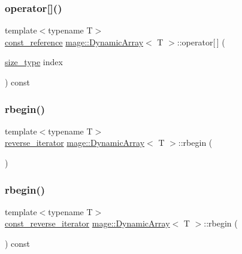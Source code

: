\subsubsection{\texorpdfstring{operator[]()}{operator[]()}\hspace{0.1cm}{\footnotesize\ttfamily [2/2]}}
{\footnotesize\ttfamily template$<$typename T$>$ \\
\mbox{\hyperlink{classmage_1_1_dynamic_array_ad2c044077223c0463e317649d4513dbc}{const\+\_\+reference}} \mbox{\hyperlink{classmage_1_1_dynamic_array}{mage\+::\+Dynamic\+Array}}$<$ T $>$\+::operator\mbox{[}$\,$\mbox{]} (\begin{DoxyParamCaption}\item[{\mbox{\hyperlink{classmage_1_1_dynamic_array_abae3236bcd8d1de414cbdf05219966b9}{size\+\_\+type}}}]{index }\end{DoxyParamCaption}) const\hspace{0.3cm}{\ttfamily [noexcept]}}

\mbox{\label{classmage_1_1_dynamic_array_ab08c41e1d517fdf97a680d956e28ea2a}} 
\subsubsection{\texorpdfstring{rbegin()}{rbegin()}\hspace{0.1cm}{\footnotesize\ttfamily [1/2]}}
{\footnotesize\ttfamily template$<$typename T$>$ \\
\mbox{\hyperlink{classmage_1_1_dynamic_array_a92d505734e8500e429d6b6e690b83dab}{reverse\+\_\+iterator}} \mbox{\hyperlink{classmage_1_1_dynamic_array}{mage\+::\+Dynamic\+Array}}$<$ T $>$\+::rbegin (\begin{DoxyParamCaption}{ }\end{DoxyParamCaption})\hspace{0.3cm}{\ttfamily [noexcept]}}

\mbox{\label{classmage_1_1_dynamic_array_a13f1ae391363a64c50bd3ffbe3100d78}} 
\subsubsection{\texorpdfstring{rbegin()}{rbegin()}\hspace{0.1cm}{\footnotesize\ttfamily [2/2]}}
{\footnotesize\ttfamily template$<$typename T$>$ \\
\mbox{\hyperlink{classmage_1_1_dynamic_array_afbcc530c2cd68cc3b0474a4b1a5c6a15}{const\+\_\+reverse\+\_\+iterator}} \mbox{\hyperlink{classmage_1_1_dynamic_array}{mage\+::\+Dynamic\+Array}}$<$ T $>$\+::rbegin (\begin{DoxyParamCaption}{ }\end{DoxyParamCaption}) const\hspace{0.3cm}{\ttfamily [noexcept]}}


